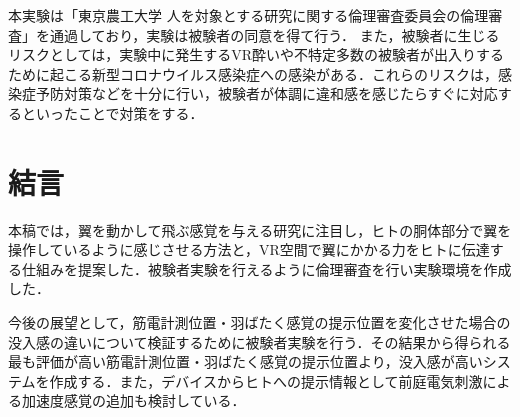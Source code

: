 \begin{small}
  本実験は「東京農工大学 人を対象とする研究に関する倫理審査委員会の倫理審査」を通過しており，実験は被験者の同意を得て行う．
  また，被験者に生じるリスクとしては，実験中に発生するVR酔いや不特定多数の被験者が出入りするために起こる新型コロナウイルス感染症への感染がある．これらのリスクは，感染症予防対策などを十分に行い，被験者が体調に違和感を感じたらすぐに対応するといったことで対策をする．
  



\section{結言}
  本稿では，翼を動かして飛ぶ感覚を与える研究に注目し，ヒトの胴体部分で翼を操作しているように感じさせる方法と，VR空間で翼にかかる力をヒトに伝達する仕組みを提案した．被験者実験を行えるように倫理審査を行い実験環境を作成した．

  今後の展望として，筋電計測位置・羽ばたく感覚の提示位置を変化させた場合の没入感の違いについて検証するために被験者実験を行う．その結果から得られる最も評価が高い筋電計測位置・羽ばたく感覚の提示位置より，没入感が高いシステムを作成する．また，デバイスからヒトへの提示情報として前庭電気刺激による加速度感覚\cite{青山一真2014前庭電気刺激における逆方向不感電流を用いた加速度感覚の増強}の追加も検討している．


{
\small
 \setlength{\kanjiskip}{0.0zw plus.01zw} %
 \setlength{\baselineskip}{9pt}        %
 \setlength{\itemsep}{0.2pt}             %
 \setlength{\lineskip}{0pt}              %


}



\end{small}

